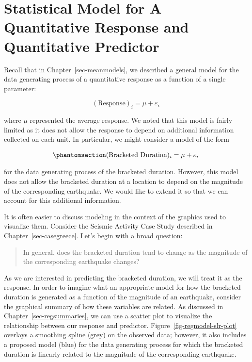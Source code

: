 \documentclass[
  letterpaper,
  DIV=11,
  numbers=noendperiod]{scrreprt}
\theoremstyle{plain}
\theoremstyle{definition}
\theoremstyle{definition}
\theoremstyle{remark}
\begin{document}
\section{Statistical Model for A Quantitative Response and Quantitative
Predictor}\label{statistical-model-for-a-quantitative-response-and-quantitative-predictor}

Recall that in Chapter~\ref{sec-meanmodels}, we described a general
model for the data generating process of a quantitative response as a
function of a single parameter:

\[(\text{Response})_i = \mu + \varepsilon_i\]

where \(\mu\) represented the average response. We noted that this model
is fairly limited as it does not allow the response to depend on
additional information collected on each unit. In particular, we might
consider a model of the form

\begin{equation}\phantomsection\label{eq-regmodel-int-only}{(\text{Bracketed Duration})_i = \mu + \varepsilon_i}\end{equation}

for the data generating process of the bracketed duration. However, this
model does not allow the bracketed duration at a location to depend on
the magnitude of the corresponding earthquake. We would like to extend
it so that we can account for this additional information.

It is often easier to discuss modeling in the context of the graphics
used to visualize them. Consider the Seismic Activity Case Study
described in Chapter~\ref{sec-casegreece}. Let's begin with a broad
question:

\begin{quote}
In general, does the bracketed duration tend to change as the magnitude
of the corresponding earthquake changes?
\end{quote}

As we are interested in predicting the bracketed duration, we will treat
it as the response. In order to imagine what an appropriate model for
how the bracketed duration is generated as a function of the magnitude
of an earthquake, consider the graphical summary of how these variables
are related. As discussed in Chapter~\ref{sec-regsummaries}, we can use
a scatter plot to visualize the relationship between our response and
predictor. Figure~\ref{fig-regmodel-slr-plot} overlays a smoothing
spline (grey) on the observed data; however, it also includes a proposed
model (blue) for the data generating process for which the bracketed
duration is linearly related to the magnitude of the corresponding
earthquake.
\end{document}
